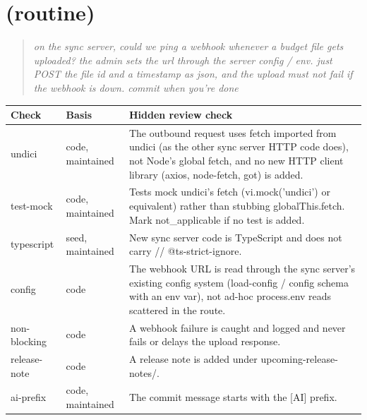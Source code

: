 \section{ (routine)}
\begin{quote}\small\itshape on the sync server, could we ping a webhook whenever a budget file gets uploaded? the admin sets the url through the server config / env. just POST the file id and a timestamp as json, and the upload must not fail if the webhook is down. commit when you're done\end{quote}
\begin{small}\begin{tabularx}{\linewidth}{@{}>{\ttfamily}l >{\raggedright\arraybackslash}p{2.2cm} >{\raggedright\arraybackslash}X@{}}
\toprule \normalfont Check & Basis & Hidden review check \\ \midrule
undici & code, maintained & The outbound request uses fetch imported from undici (as the other sync server HTTP code does), not Node's global fetch, and no new HTTP client library (axios, node-fetch, got) is added. \\
test-mock & code, maintained & Tests mock undici's fetch (vi.mock('undici') or equivalent) rather than stubbing globalThis.fetch. Mark not\_applicable if no test is added. \\
typescript & seed, maintained & New sync server code is TypeScript and does not carry // @ts-strict-ignore. \\
config & code & The webhook URL is read through the sync server's existing config system (load-config / config schema with an env var), not ad-hoc process.env reads scattered in the route. \\
non-blocking & code & A webhook failure is caught and logged and never fails or delays the upload response. \\
release-note & code & A release note is added under upcoming-release-notes/. \\
ai-prefix & code, maintained & The commit message starts with the [AI] prefix. \\
\bottomrule\end{tabularx}\end{small}

